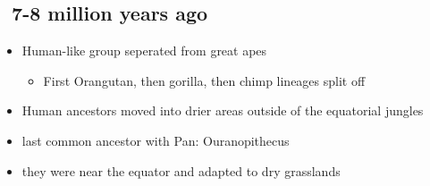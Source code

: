 \documentclass{article}
\theoremstyle{definition}
\begin{document}
\subsection{~7-8 million years ago}
\begin{itemize}
	\item Human-like group seperated from great apes
		\begin{itemize}
			\item First Orangutan, then gorilla, then chimp lineages split off
		\end{itemize}
	\item Human ancestors moved into drier areas outside of the equatorial jungles
	\item last common ancestor with Pan: Ouranopithecus 
	\item they were near the equator and adapted to dry grasslands
\end{itemize}
\end{document}
